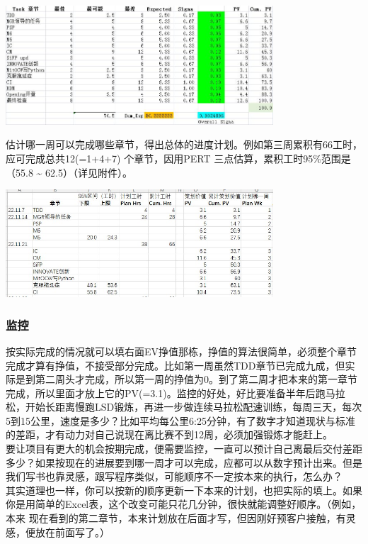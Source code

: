 {\begin{minipage}[t]{0.97\columnwidth}

\includegraphics[width=10cm]{psp11.jpg}

估计哪一周可以完成哪些章节，得出总体的进度计划。例如第三周累积有66工时，应可完成总共12(=1+4+7)
个章节，因用PERT 三点估算，累积工时95\%范围是（55.8 \textasciitilde{}
62.5）（详见附件）。


\includegraphics[width=10cm]{PSP3wksPlanScreenshot20221126085813.jpg}

\hypertarget{ux76d1ux63a7}{%
\subsubsection{监控}\label{ux76d1ux63a7}}

按实际完成的情况就可以填右面EV挣值那栋，挣值的算法很简单，必须整个章节完成才算有挣值，不接受部分完成。比如第一周虽然TDD章节已完成九成，但实际是到第二周头才完成，所以第一周的挣值为0。到了第二周才把本来的第一章节完成，所以里面才放上它的PV(=3.1)。监控的好处，好比要准备半年后跑马拉松，开始长距离慢跑LSD锻炼，再进一步做连续马拉松配速训练，每周三天，每次5到15公里，速度是多少？比如平均每公里6:25分钟，有了数字才知道现状与标准的差距，才有动力对自己说现在离比赛不到12周，必须加强锻炼才能赶上。\\
要让项目有更大的机会按期完成，便需要监控，一直可以预计自己离最后交付差距多少？如果按现在的进展要到哪一周才可以完成，应都可以从数字预计出来。但是我们写书也靠灵感，跟写程序类似，可能顺序不一定按本来的执行，怎么办？\\
其实道理也一样，你可以按新的顺序更新一下本来的计划，也把实际的填上。如果你是用简单的Excel表，这个改变可能只花几分钟，很快就能调整好顺序。（例如，本来
现在看到的第二章节，本来计划放在后面才写，但因刚好预客户接触，有灵感，便放在前面写了。）


\end{minipage}}
